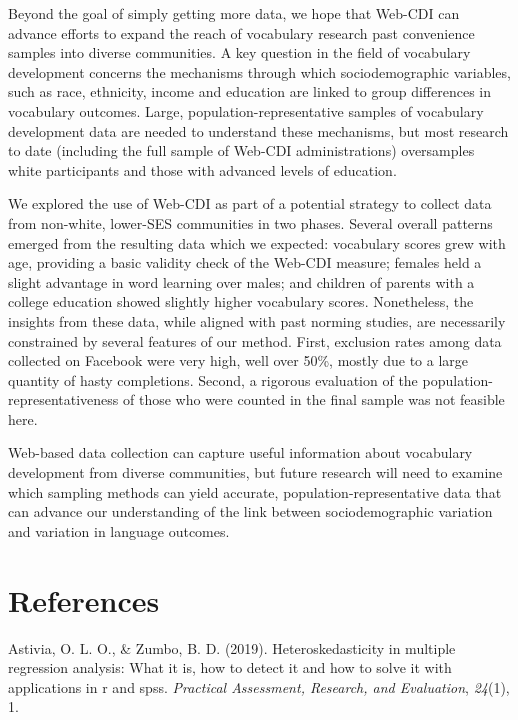 \documentclass[
  english,
  ,man,floatsintext]{apa6}
\begin{document}
Beyond the goal of simply getting more data, we hope that Web-CDI can advance efforts to expand the reach of vocabulary research past convenience samples into diverse communities. A key question in the field of vocabulary development concerns the mechanisms through which sociodemographic variables, such as race, ethnicity, income and education are linked to group differences in vocabulary outcomes. Large, population-representative samples of vocabulary development data are needed to understand these mechanisms, but most research to date (including the full sample of Web-CDI administrations) oversamples white participants and those with advanced levels of education.

We explored the use of Web-CDI as part of a potential strategy to collect data from non-white, lower-SES communities in two phases. Several overall patterns emerged from the resulting data which we expected: vocabulary scores grew with age, providing a basic validity check of the Web-CDI measure; females held a slight advantage in word learning over males; and children of parents with a college education showed slightly higher vocabulary scores. Nonetheless, the insights from these data, while aligned with past norming studies, are necessarily constrained by several features of our method. First, exclusion rates among data collected on Facebook were very high, well over 50\%, mostly due to a large quantity of hasty completions. Second, a rigorous evaluation of the population-representativeness of those who were counted in the final sample was not feasible here.

Web-based data collection can capture useful information about vocabulary development from diverse communities, but future research will need to examine which sampling methods can yield accurate, population-representative data that can advance our understanding of the link between sociodemographic variation and variation in language outcomes.

\newpage

\hypertarget{references}{%
\section{References}\label{references}}

\begingroup
\setlength{\parindent}{-0.5in}
\setlength{\leftskip}{0.5in}

\hypertarget{refs}{}
\leavevmode\hypertarget{ref-Astivia2019}{}%
Astivia, O. L. O., \& Zumbo, B. D. (2019). Heteroskedasticity in multiple regression analysis: What it is, how to detect it and how to solve it with applications in r and spss. \emph{Practical Assessment, Research, and Evaluation}, \emph{24}(1), 1.
\end{document}
